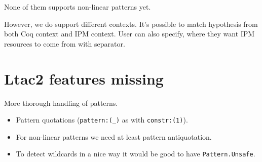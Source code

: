 None of them supports non-linear patterns yet.

However, we do support different contexts.
It's possible to match hypothesis from both Coq context and IPM context.
User can also specify, where they want IPM resources to come from with separator.


\section{Ltac2 features missing}

More thorough handling of patterns.
\begin{itemize}
\item Pattern quotations (\lstinline|pattern:(_)| as with \lstinline|constr:(1)|).
\item For non-linear patterns we need at least pattern antiquotation.
\item To detect wildcards in a nice way it would be good to have \lstinline|Pattern.Unsafe|.
\end{itemize}

